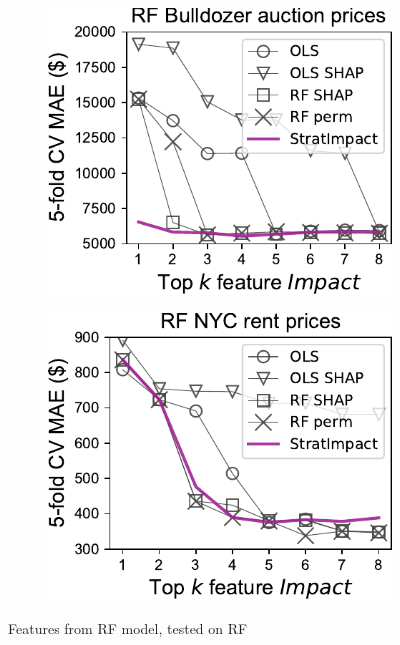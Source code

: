 \documentclass[11pt]{article}
\begin{document}
\begin{figure}
\hfill
\begin{subfigure}{.245\textwidth}
    \centering
\includegraphics[scale=0.45]{images/bulldozer-topk-RF-Impact.pdf}
\end{subfigure}%
\hfill
\begin{subfigure}{.245\textwidth}
    \centering
\includegraphics[scale=0.45]{images/rent-topk-RF-Impact.pdf}
\end{subfigure}
\caption[short]{Features from RF model, tested on RF}
\label{fig:topk-impact}
\end{figure}
\end{document}
